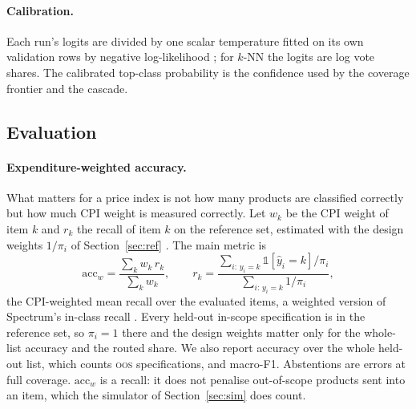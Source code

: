 \paragraph{Calibration.} Each run's logits are divided by one scalar temperature fitted on its
own validation rows by negative log-likelihood \citep{guo2017calibration}; for $k$-NN the
logits are log vote shares. The calibrated top-class probability is the confidence used by
the coverage frontier and the cascade.

\subsection{Evaluation}\label{sec:eval}

\paragraph{Expenditure-weighted accuracy.} What matters for a price index is not how many
products are classified correctly but how much CPI weight is measured correctly. Let $w_k$ be
the CPI weight of item $k$ and $r_k$ the recall of item $k$ on the reference set, estimated
with the design weights $1/\pi_i$ of Section~\ref{sec:ref} \citep{horvitz1952}. The main
metric is
\begin{equation}
\mathrm{acc}_w = \frac{\sum_k w_k\, r_k}{\sum_k w_k}, \qquad
r_k = \frac{\sum_{i:\, y_i = k} \mathbb{1}[\hat y_i = k]/\pi_i}{\sum_{i:\, y_i = k} 1/\pi_i},
\label{eq:accw}
\end{equation}
the CPI-weighted mean recall over the evaluated items, a weighted version of Spectrum's
in-class recall \citep[p.~22]{bis2026spectrum}. Every held-out in-scope specification is in
the reference set, so $\pi_i = 1$ there and the design weights matter only for the whole-list
accuracy and the routed share. We also report accuracy over the whole held-out list, which
counts \textsc{oos} specifications, and macro-F1. Abstentions are errors at full coverage.
$\mathrm{acc}_w$ is a recall: it does not penalise out-of-scope products sent into an item,
which the simulator of Section~\ref{sec:sim} does count.

